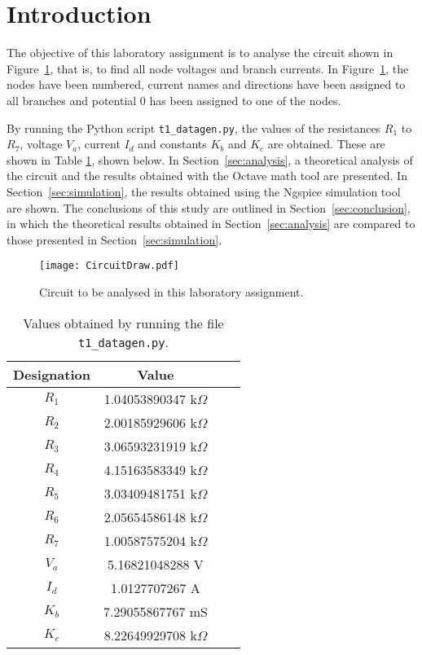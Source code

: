 \section{Introduction}
\label{sec:introduction}

The objective of this laboratory assignment is to analyse the circuit shown in Figure~\ref{fig:CircuitDraw}, that is, to find all node voltages and branch currents. In Figure~\ref{fig:CircuitDraw}, the nodes have been numbered, current names and directions have been assigned to all branches and potential $0$ has been assigned to one of the nodes.
\par
By running the Python script \texttt{t1\_datagen.py}, the values of the resistances $R_1$ to $R_7$, voltage $V_a$, current $I_d$ and constants $K_b$ and $K_c$ are obtained. These are shown in Table \ref{tab:GivenValues}, shown below. In Section~\ref{sec:analysis}, a theoretical analysis of the circuit and the results obtained with the Octave math tool are presented. In Section~\ref{sec:simulation}, the results obtained using the Ngspice simulation tool are shown. The conclusions of this study are outlined in Section~\ref{sec:conclusion}, in which the theoretical results obtained in Section~\ref{sec:analysis} are compared to those presented in Section~\ref{sec:simulation}.

\begin{figure}[H] \centering
  \texttt{[image: CircuitDraw.pdf]}
  \caption{Circuit to be analysed in this laboratory assignment.}
  \label{fig:CircuitDraw}
\end{figure}

\begin{table}[H]
  \centering
  \begin{tabular}{|c|c|c|c|}
    \hline
        {\bf Designation} & {\bf Value}  \\
        \hline
        $R_1$ & 1.04053890347 k$\Omega$ \\
        \hline
        $R_2$ & 2.00185929606 k$\Omega$ \\
        \hline
        $R_3$ & 3.06593231919 k$\Omega$ \\
        \hline
        $R_4$ & 4.15163583349 k$\Omega$ \\
        \hline
        $R_5$ & 3.03409481751 k$\Omega$ \\
        \hline
        $R_6$ & 2.05654586148 k$\Omega$ \\
        \hline
        $R_7$ & 1.00587575204 k$\Omega$ \\
        \hline
        $V_a$ & 5.16821048288 V\\
        \hline
        $I_d$ & 1.0127707267 A\\
        \hline
        $K_b$ & 7.29055867767 mS\\
        \hline
        $K_c$ & 8.22649929708 k$\Omega$ \\
        \hline
  \end{tabular}
  \caption[]{Values obtained by running the file \texttt{t1\_datagen.py}.}
  \label{tab:GivenValues}
\end{table}

